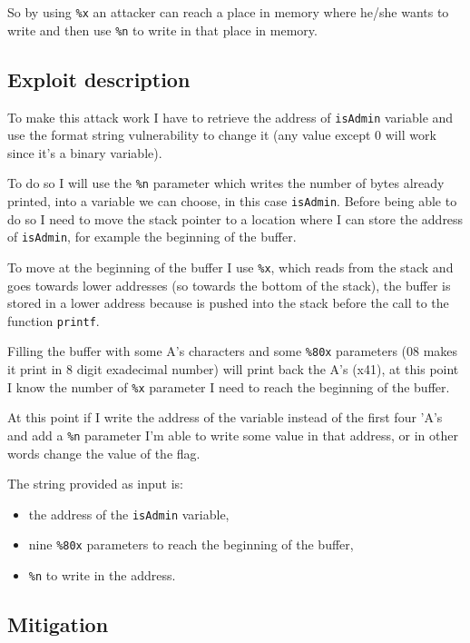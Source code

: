 \documentclass[a4paper,12pt]{article}
\begin{document}
So by using \texttt{\%x} an attacker can reach a place in memory where he/she wants to write and then use \texttt{\%n} to write in that place in memory.


\subsection{Exploit description}

To make this attack work I have to retrieve the address of \texttt{isAdmin} variable and use the format string vulnerability to change it (any value except 0 will work since it's a binary variable). 

To do so I will use the \texttt{\%n} parameter which writes the number of bytes already printed, into a variable we can choose, in this case \texttt{isAdmin}. Before being able to do so I need to move the stack pointer to a location where I can store the address of \texttt{isAdmin}, for example the beginning of the buffer.

To move at the beginning of the buffer I use \texttt{\%x}, which reads from the stack and goes towards lower addresses (so towards the bottom of the stack), the buffer is stored in a lower address because is pushed into the stack before the call to the function \texttt{printf}.

Filling the buffer with some A's characters and some \texttt{\%80x} parameters (08 makes it print in 8 digit exadecimal number) will print back the A's (x41), at this point I know the number of \texttt{\%x} parameter I need to reach the beginning of the buffer.

At this point if I write the address of the variable instead of the first four 'A's and add a \texttt{\%n} parameter I'm able to write some value in that address, or in other words change the value of the flag.

The string provided as input is:
\begin{itemize}
\item the address of the \texttt{isAdmin} variable,
\item nine \texttt{\%80x} parameters to reach the beginning of the buffer,
\item \texttt{\%n} to write in the address.
\end{itemize}


\subsection{Mitigation}
\end{document}
